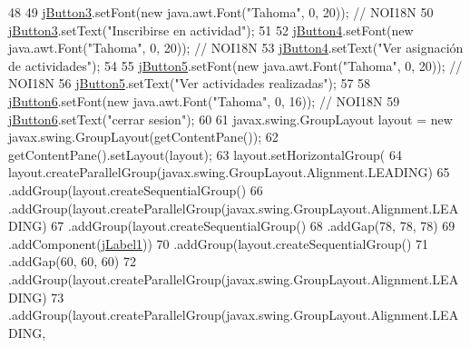 \begin{DoxyCode}
48 
49         \mbox{\hyperlink{classsoftware_1_1opcionespreso_adf21589322eda1079c8f08265ec86a83}{jButton3}}.setFont(\textcolor{keyword}{new} java.awt.Font(\textcolor{stringliteral}{"Tahoma"}, 0, 20)); \textcolor{comment}{// NOI18N}
50         \mbox{\hyperlink{classsoftware_1_1opcionespreso_adf21589322eda1079c8f08265ec86a83}{jButton3}}.setText(\textcolor{stringliteral}{"Inscribirse en actividad"});
51 
52         \mbox{\hyperlink{classsoftware_1_1opcionespreso_a7fe878181ce5171fa1a59956d589d900}{jButton4}}.setFont(\textcolor{keyword}{new} java.awt.Font(\textcolor{stringliteral}{"Tahoma"}, 0, 20)); \textcolor{comment}{// NOI18N}
53         \mbox{\hyperlink{classsoftware_1_1opcionespreso_a7fe878181ce5171fa1a59956d589d900}{jButton4}}.setText(\textcolor{stringliteral}{"Ver asignación de actividades"});
54 
55         \mbox{\hyperlink{classsoftware_1_1opcionespreso_a5948e430eec5399935a10ca8300296df}{jButton5}}.setFont(\textcolor{keyword}{new} java.awt.Font(\textcolor{stringliteral}{"Tahoma"}, 0, 20)); \textcolor{comment}{// NOI18N}
56         \mbox{\hyperlink{classsoftware_1_1opcionespreso_a5948e430eec5399935a10ca8300296df}{jButton5}}.setText(\textcolor{stringliteral}{"Ver actividades realizadas"});
57 
58         \mbox{\hyperlink{classsoftware_1_1opcionespreso_af727e23b9f6fb213484737b6fb3a63d9}{jButton6}}.setFont(\textcolor{keyword}{new} java.awt.Font(\textcolor{stringliteral}{"Tahoma"}, 0, 16)); \textcolor{comment}{// NOI18N}
59         \mbox{\hyperlink{classsoftware_1_1opcionespreso_af727e23b9f6fb213484737b6fb3a63d9}{jButton6}}.setText(\textcolor{stringliteral}{"cerrar sesion"});
60 
61         javax.swing.GroupLayout layout = \textcolor{keyword}{new} javax.swing.GroupLayout(getContentPane());
62         getContentPane().setLayout(layout);
63         layout.setHorizontalGroup(
64             layout.createParallelGroup(javax.swing.GroupLayout.Alignment.LEADING)
65             .addGroup(layout.createSequentialGroup()
66                 .addGroup(layout.createParallelGroup(javax.swing.GroupLayout.Alignment.LEADING)
67                     .addGroup(layout.createSequentialGroup()
68                         .addGap(78, 78, 78)
69                         .addComponent(\mbox{\hyperlink{classsoftware_1_1opcionespreso_a61c0885ed9ce31eca799d9b0507589b7}{jLabel1}}))
70                     .addGroup(layout.createSequentialGroup()
71                         .addGap(60, 60, 60)
72                         .addGroup(layout.createParallelGroup(javax.swing.GroupLayout.Alignment.LEADING)
73                             .addGroup(layout.createParallelGroup(javax.swing.GroupLayout.Alignment.LEADING,

\end{DoxyCode}
